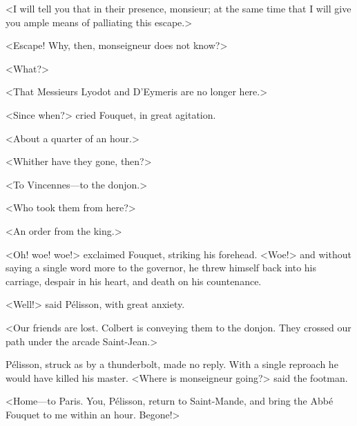 <I will tell you that in their presence, monsieur; at the same time that I will give you ample means of palliating this escape.>

<Escape! Why, then, monseigneur does not know?>

<What?>

<That Messieurs Lyodot and D'Eymeris are no longer here.>

<Since when?> cried Fouquet, in great agitation.

<About a quarter of an hour.>

<Whither have they gone, then?>

<To Vincennes—to the donjon.>

<Who took them from here?>

<An order from the king.>

<Oh! woe! woe!> exclaimed Fouquet, striking his forehead. <Woe!> and without saying a single word more to the governor, he threw himself back into his carriage, despair in his heart, and death on his countenance.

<Well!> said Pélisson, with great anxiety.

<Our friends are lost. Colbert is conveying them to the donjon. They crossed our path under the arcade Saint-Jean.>

Pélisson, struck as by a thunderbolt, made no reply. With a single reproach he would have killed his master. <Where is monseigneur going?> said the footman.

<Home—to Paris. You, Pélisson, return to Saint-Mande, and bring the Abbé Fouquet to me within an hour. Begone!> 
